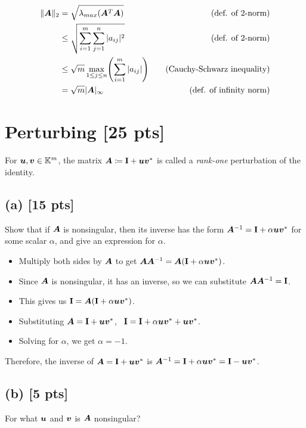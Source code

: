 \documentclass[twoside,10pt]{article}
\newcommand{\aln}[1]{\begin{align}#1\end{align}}
\newcommand{\s}{\enspace}
\begin{document}
\aln{
  \|\mtx{A}\|_2 &= \sqrt{\lambda_{max}(\mtx{A}^T\mtx{A})} & \quad \text{(def. of 2-norm)}\\
  &\leq \sqrt{\sum_{i=1}^{m}\sum_{j=1}^{n}|a_{ij}|^2} & \quad \text{(def. of 2-norm)}\\
  &\leq \sqrt{m}\max_{1\leq j \leq n}\left(\sum_{i=1}^{m}|a_{ij}|\right) & \quad \text{(Cauchy-Schwarz inequality)}\\
  &= \sqrt{m}|\mtx{A}|_{\infty} & \quad \text{(def. of infinity norm)}
}

\section{Perturbing [25 pts]}
For $\bm{u}, \bm{v} \in \mathbb{K}^m$, the matrix $\bm{A} \coloneqq \mathbf{I} + \bm{u}\bm{v}^{*}$ is called a \emph{rank-one} perturbation of the identity. 

\subsection*{(a) [15 pts]}
Show that if $\bm{A}$ is nonsingular, then its inverse has the form $\bm{A}^{-1} = \mathbf{I} + \alpha \bm{u}\bm{v}^{*}$ for some scalar $\alpha$, and give an expression for $\alpha$.

\begin{itemize}
\item Multiply both sides by $\bm{A}$ to get $\bm{A}\bm{A}^{-1} = \bm{A}(\mathbf{I} + \alpha \bm{u}\bm{v}^{*})$.
\item Since $\bm{A}$ is nonsingular, it has an inverse, so we can substitute $\bm{A}\bm{A}^{-1} = \mathbf{I}$.
\item This gives us $\mathbf{I} = \bm{A}(\mathbf{I} + \alpha \bm{u}\bm{v}^{*})$.
\item Substituting $\bm{A} = \mathbf{I} + \bm{u}\bm{v}^{*}$, $\s \Id = \Id + \alpha \vct{u}\vct{v}^{*} + \vct{u}\vct{v}^{*}$.
\item Solving for $\alpha$, we get $\alpha = -1$.
\end{itemize}

Therefore, the inverse of $\bm{A} = \mathbf{I} + \bm{u}\bm{v}^{*}$ is $\bm{A}^{-1} = \mathbf{I} + \alpha \bm{u}\bm{v}^{*} = \mathbf{I} - \bm{u}\bm{v}^{*}$.
  
\subsection*{(b) [5 pts]}
For what $\bm{u}$ and $\bm{v}$ is $\bm{A}$ nonsingular? 
\end{document}
